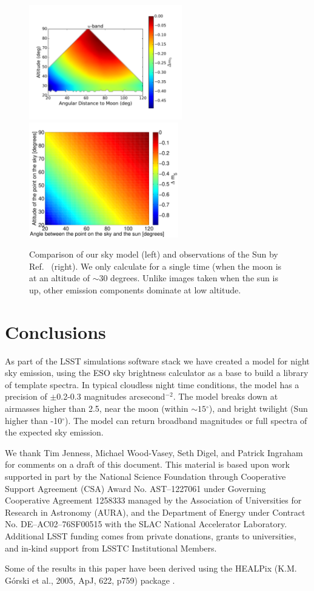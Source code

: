 \documentclass[]{spie}
\newcommand\degree{{^\circ}}
\begin{document}
\begin{figure}
  \begin{center}
  \includegraphics[height=5cm]{plots/deltam5.pdf}\includegraphics[height=5cm]{plots/a1_alt_angle_meshgrid.pdf}
  \end{center}
  \caption{ Comparison of our sky model (left) and observations of the Sun by Ref.~ (right).  We only calculate for a single time (when the moon is at an altitude of $\sim 30$ degrees. Unlike images taken when the sun is up, other emission components dominate at low altitude.  \label{fig:cCompare}}
\end{figure}

\section{Conclusions}

As part of the LSST simulations software stack we have created a model for night sky emission, using the ESO sky brightness calculator as a base to build a library of template spectra.  In typical cloudless night time conditions, the model has a precision of $\pm$0.2-0.3 magnitudes arcsecond$^{-2}$. The model breaks down at airmasses higher than 2.5, near the moon (within $\sim15\degree$), and bright twilight (Sun higher than -10$\degree$).  The model can return broadband magnitudes or full spectra of the expected sky emission.  


\acknowledgments        
 
We thank Tim Jenness, Michael Wood-Vasey, Seth Digel, and Patrick Ingraham for comments on a draft of this document.  This material is based upon work supported in part by the National Science Foundation through Cooperative Support Agreement (CSA) Award No. AST–1227061 under Governing Cooperative Agreement 1258333 managed by the Association of Universities for Research in Astronomy (AURA), and the Department of Energy under Contract No. DE–AC02–76SF00515 with the SLAC National Accelerator Laboratory. Additional LSST funding comes from private donations, grants to universities, and in-kind support from LSSTC Institutional Members.

Some of the results in this paper have been derived using the HEALPix (K.M. G{\'o}rski et al., 2005, ApJ, 622, p759) package \cite{Gorski05}.



\end{document}

